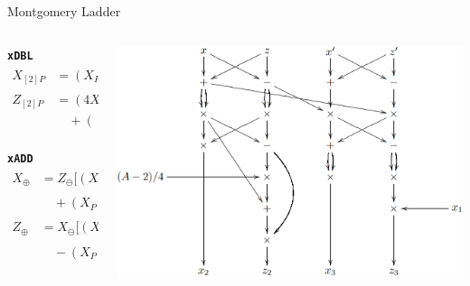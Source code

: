 \begin{frame}{Montgomery Ladder}
    \begin{columns}
        \begin{column}{0.4\textwidth}
            \textbf{\texttt{xDBL}}
            \begin{align*}
                X_{[2]P} &= (X_P + Z_P)^2 (X_P - Z_P)^2 \\
                Z_{[2]P} &= (4X_PZ_P)((X_P - Z_P)^2 \\ &\quad+ \left((A + 2)/4)(4X_PZ_P)\right)
\end{align*} \\
\textbf{\texttt{xADD}}
            \begin{align*}
                X_{\oplus} &= Z_{\ominus} [ (X_P - Z_P)(X_Q + Z_Q) \\
                & \quad + (X_P + Z_P)(X_Q - Z_Q) ]^2 \\
                Z_{\oplus} &= X_{\ominus} [ (X_P - Z_P)(X_Q + Z_Q) \\
                &\quad - (X_P + Z_P)(X_Q - Z_Q) ]^2
                \end{align*}
            
        \end{column}
        \begin{column}{0.7\textwidth}
            \includegraphics[width=1\textwidth]{tex/img/ladder.png}
      
        \end{column}
    \end{columns}
    
\end{frame}

